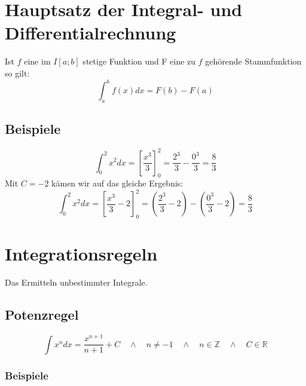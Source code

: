 \documentclass[12pt, a4paper]{report}
\begin{document}
\section{Hauptsatz der Integral- und Differentialrechnung}
Ist $f$ eine im $I[a;b]$ stetige Funktion und F eine zu $f$ gehörende Stammfunktion so gilt:\\
\begin{equation}
\int_{a}^{b} f(x) dx = F(b)-F(a)
\end{equation}

\subsection{Beispiele}

\begin{equation}
\int_{0}^{2} x^2 dx = \left[\frac{x^3}{3}\right]_0^2=\frac{2^3}{3}-\frac{0^3}{3}=\frac{8}{3}
\end{equation}
Mit $C=-2$ kämen wir auf das gleiche Ergebnis:
\begin{equation}
\int_{0}^{2} x^2 dx = \left[\frac{x^3}{3}-2\right]_0^2=\left(\frac{2^3}{3}-2\right)-\left(\frac{0^3}{3}-2\right)=\frac{8}{3}
\end{equation}

\section{Integrationsregeln}
Das Ermitteln unbestimmter Integrale.
\subsection{Potenzregel}
\begin{equation}
\int x^n dx = \frac{x^{n+1}}{n+1}+C\quad \land \quad n\neq-1\quad \land \quad n\in \mathbb{Z}\quad \land \quad  C\in \mathbb{R}
\end{equation}
\subsubsection{Beispiele}
\end{document}
